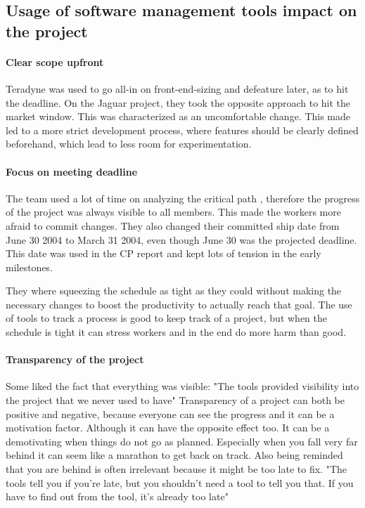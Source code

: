 \subsection{Usage of software management tools impact on the project}
\paragraph{Clear scope upfront} Teradyne was used to go all-in on front-end-sizing and defeature later, as to hit the deadline. On the Jaguar project, they took the opposite approach to hit the market window.  This was characterized as an uncomfortable change. \cite[p. 8]{GinoPisano2005} This made led to a more strict development process, where features should be clearly defined beforehand, which lead to less room for experimentation.

\paragraph{Focus on meeting deadline} The team used a lot of time on analyzing the critical path \cite[p. 8]{GinoPisano2005}, therefore the progress of the project was always visible to all members. This made the workers more afraid to commit changes. They also changed their committed ship date from June 30 2004 to March 31 2004, even though June 30 was the projected deadline. \cite[p. 12]{GinoPisano2005} This date was used in the CP report and kept lots of tension in the early milestones.

They where squeezing the schedule as tight as they could without making the necessary changes to boost the productivity to actually reach that goal. The use of tools to track a process is good to keep track of a project, but when the schedule is tight it can stress workers and in the end do more harm than good. 

\paragraph{Transparency of the project} Some liked the fact that everything was visible: "The tools provided visibility into the project that we never used to have" \cite[p. 12]{GinoPisano2005}
Transparency of a project can both be positive and negative, because everyone can see the progress and it can be a motivation factor. Although it can have the opposite effect too. It can be a demotivating when things do not go as planned. Especially when you fall very far behind it can seem like a marathon to get back on track. Also being reminded that you are behind is often irrelevant because it might be too late to fix. "The tools tell you if you're late, but you shouldn't need a tool to tell you that. If you have to find out from the tool, it's already too late" \cite[p. 12]{GinoPisano2005}

